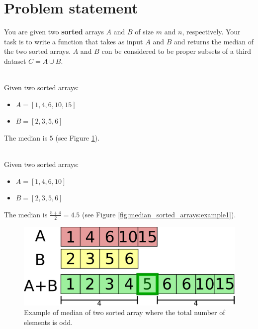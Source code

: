 \section{Problem statement}
\begin{exercise}
You are given two \textbf{sorted} arrays $A$ and $B$ of size $m$ and $n$, respectively. Your task is
to write a function that takes as input $A$ and $B$ and returns the median of the two sorted arrays.
$A$ and $B$ con be considered to be proper subsets of a third dataset $C = A \cup B$. 

	\begin{example}
		\hfill \\
		Given two sorted arrays:
		\begin{itemize}
			\item $A=[1,4,6,10,15]$
			\item $B=[2,3,5,6]$
		\end{itemize}
		The median is $5$ (see Figure \ref{fig:median_sorted_arrays:example2}).
	\end{example}

	\begin{example}
		\hfill \\
		Given two sorted arrays:
		\begin{itemize}
			\item $A=[1,4,6,10]$
			\item $B=[2,3,5,6]$
		\end{itemize}
		The median is $\frac{5+4}{2} = 4.5$ (see Figure \ref{fig:median_sorted_arrays:example1}).
	\end{example}

\end{exercise}

\begin{figure}
	\label{fig:median_sorted_arrays:example2}
	\centering
	\includegraphics[scale=1.0]{sources/median_sorted_arrays/images/example2}
	\caption[Example of median of two sorted array.]{Example of median of two sorted array where the total number of elements is odd.}
\end{figure}

